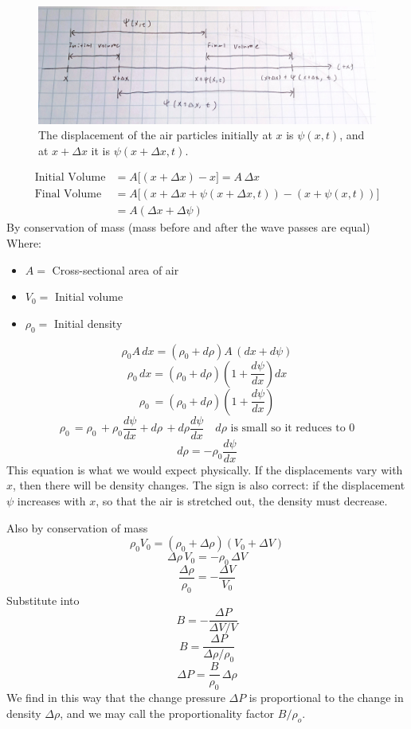 \documentclass[12pt]{article}
\begin{document}
\begin{enumerate}
\begin{itemize}
\begin{figure}[H]
    \centering
    \includegraphics[width=1\textwidth]{Sound.JPG}
    \caption{The displacement of the air particles initially at $x$ is $\psi(x,t)$, and at $x+\Delta x$ it is $\psi(x+\Delta x,t)$.}
\end{figure}
\begin{align*}
\text{Initial Volume} &= A \big[(x + \Delta x) - x\big] = A \, \Delta x
\\ \text{Final Volume} &= A \Big[ (x + \Delta x + \psi(x + \Delta x, t)) - (x + \psi(x, t)) \Big] \\
&= A (\Delta x + \Delta \psi)
\end{align*}
By conservation of mass (mass before and after the wave passes are equal)
\\  Where:
\begin{itemize}
    \item $A =$ Cross-sectional area of air
    \item $V_0 =$ Initial volume
    \item $\rho_0 =$ Initial density
\end{itemize}
\[
\rho_0 A \, dx = (\rho_0 + d\rho) A \, (dx + d\psi)
\]
\[
\rho_0 \, dx = (\rho_0 + d\rho) \left( 1 + \frac{d\psi}{dx} \right) dx
\]
\[
\rho_0 \ = (\rho_0 + d\rho) \left( 1 + \frac{d\psi}{dx} \right) 
\]
\[
\rho_0 \, = \rho_0 \, + \rho_0 \frac{d\psi}{dx} + d\rho \,  + d\rho \frac{d\psi}{dx} \quad \text{$d\rho$ is small so it reduces to 0}
\]
\begin{equation}
\boxed{d\rho = - \rho_0 \frac{d\psi}{dx}}
\label{1}
\end{equation}
This equation is what we would expect physically. If the displacements vary with $x$, then there will be density changes. The sign is also correct: if the displacement $\psi$ increases with $x$, so that the air is stretched out, the density must decrease.

\vspace{1em} Also by conservation of mass
\[
\rho_0 V_0 = (\rho_0 + \Delta \rho)(V_0 + \Delta V)
\]
\[
\Delta \rho \, V_0 = - \rho_0 \, \Delta V
\]
\[
\frac{\Delta \rho}{\rho_0} = - \frac{\Delta V}{V_0}
\]
Substitute into
\[
B = - \frac{\Delta P}{\Delta V / V}
\]
\[
B = \frac{\Delta P}{\Delta \rho / \rho_0}
\]
\begin{equation}
\boxed{\Delta P = \frac{B}{\rho_0} \, \Delta \rho}
\label{eqn:2}
\end{equation}
We find in this way that the change pressure $\Delta P$ is proportional to the change in density $\Delta \rho$, and we may call the proportionality factor $B/\rho_o$.


\end{itemize}
\end{enumerate}
\end{document}
